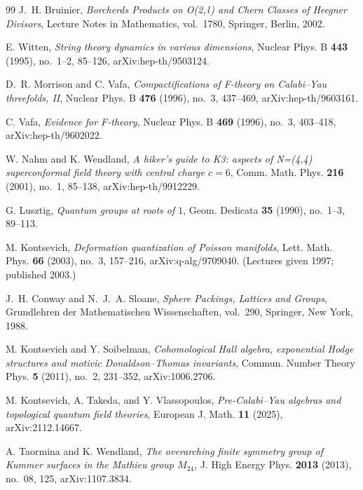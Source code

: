 \begin{thebibliography}{99}
J.~H. Bruinier, \emph{Borcherds Products on O(2,\,$l$) and Chern Classes of Heegner Divisors}, Lecture Notes in Mathematics, vol.~1780, Springer, Berlin, 2002.

E. Witten, \emph{String theory dynamics in various dimensions}, Nuclear Phys. B \textbf{443} (1995), no.~1--2, 85--126, arXiv:hep-th/9503124.

D.~R. Morrison and C. Vafa, \emph{Compactifications of F-theory on Calabi--Yau threefolds, II}, Nuclear Phys. B \textbf{476} (1996), no.~3, 437--469, arXiv:hep-th/9603161.

C. Vafa, \emph{Evidence for F-theory}, Nuclear Phys. B \textbf{469} (1996), no.~3, 403--418, arXiv:hep-th/9602022.

W. Nahm and K. Wendland, \emph{A hiker's guide to K3: aspects of N=(4,4) superconformal field theory with central charge $c=6$}, Comm. Math. Phys. \textbf{216} (2001), no.~1, 85--138, arXiv:hep-th/9912229.

G. Lusztig, \emph{Quantum groups at roots of $1$}, Geom. Dedicata \textbf{35} (1990), no.~1--3, 89--113.

M. Kontsevich, \emph{Deformation quantization of Poisson manifolds}, Lett. Math. Phys. \textbf{66} (2003), no.~3, 157--216, arXiv:q-alg/9709040. (Lectures given 1997; published 2003.)

J.~H. Conway and N.~J.~A. Sloane, \emph{Sphere Packings, Lattices and Groups}, Grundlehren der Mathematischen Wissenschaften, vol.~290, Springer, New York, 1988.

M. Kontsevich and Y. Soibelman, \emph{Cohomological Hall algebra, exponential Hodge structures and motivic Donaldson--Thomas invariants}, Commun. Number Theory Phys. \textbf{5} (2011), no.~2, 231--352, arXiv:1006.2706.

M. Kontsevich, A. Takeda, and Y. Vlassopoulos, \emph{Pre-Calabi--Yau algebras and topological quantum field theories}, European J. Math. \textbf{11} (2025), arXiv:2112.14667.

A. Taormina and K. Wendland, \emph{The overarching finite symmetry group of Kummer surfaces in the Mathieu group $M_{24}$}, J. High Energy Phys. \textbf{2013} (2013), no.~08, 125, arXiv:1107.3834.


\end{thebibliography}
